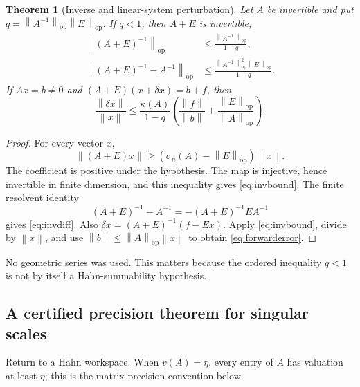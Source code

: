 \documentclass[11pt,a4paper]{article}
\numberwithin{equation}{section}
\newtheorem{theorem}{Theorem}[section]
\theoremstyle{definition}
\theoremstyle{remark}
\newcommand{\op}{\mathrm{op}}
\newcommand{\norm}[1]{\left\lVert#1\right\rVert}
\begin{document}
\begin{theorem}[Inverse and linear-system perturbation]\label{thm:inversepert}
Let $A$ be invertible and put
$q=\norm{A^{-1}}_{\op}\norm E_{\op}$. If $q<1$, then $A+E$ is invertible,
\begin{align}
 \norm{(A+E)^{-1}}_{\op}
 &\le\frac{\norm{A^{-1}}_{\op}}{1-q},\label{eq:invbound}\\
 \norm{(A+E)^{-1}-A^{-1}}_{\op}
 &\le\frac{\norm{A^{-1}}_{\op}^2\norm E_{\op}}{1-q}.
 \label{eq:invdiff}
\end{align}
If $Ax=b\ne0$ and $(A+E)(x+\delta x)=b+f$, then
\begin{equation}\label{eq:forwarderror}
 \frac{\norm{\delta x}}{\norm x}
 \le\frac{\kappa(A)}{1-q}
 \left(\frac{\norm f}{\norm b}
             +\frac{\norm E_{\op}}{\norm A_{\op}}\right).
\end{equation}
\end{theorem}
\begin{proof}
For every vector $x$,
\[
 \norm{(A+E)x}\ge
 (\sigma_n(A)-\norm E_{\op})\norm x.
\]
The coefficient is positive under the hypothesis. The map is injective,
hence invertible in finite dimension, and this inequality gives
\eqref{eq:invbound}. The finite resolvent identity
\[
 (A+E)^{-1}-A^{-1}=-(A+E)^{-1}EA^{-1}
\]
gives \eqref{eq:invdiff}. Also
$\delta x=(A+E)^{-1}(f-Ex)$. Apply \eqref{eq:invbound}, divide by
$\norm x$, and use $\norm b\le\norm A_{\op}\norm x$ to obtain
\eqref{eq:forwarderror}.
\end{proof}

No geometric series was used. This matters because the ordered inequality
$q<1$ is not by itself a Hahn-summability hypothesis.

\subsection{A certified precision theorem for singular scales}
Return to a Hahn workspace. When $v(A)=\eta$, every entry of $A$ has
valuation at least $\eta$; this is the matrix precision convention below.
\end{document}
